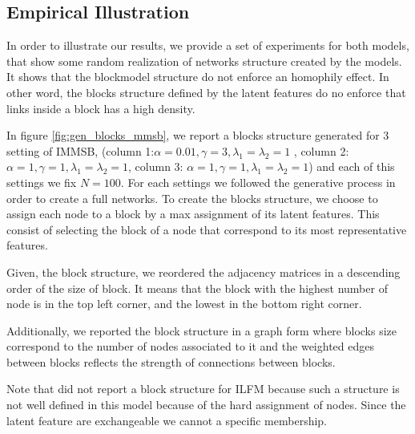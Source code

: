 \subsection{Empirical Illustration}
\label{subsec:mg}

In order to illustrate our results, we provide a set of experiments for both models, that show some random realization of networks structure created by the models. It shows that the blockmodel structure do not enforce an homophily effect. In other word, the blocks structure defined by the latent features do no enforce that links inside a block has a high density.

In figure \ref{fig:gen_blocks_mmsb}, we report a blocks structure generated for 3 setting of IMMSB, (column 1:$\alpha=0.01, \gamma=3, \lambda_1=\lambda_2=1$ , column 2:$\alpha=1, \gamma=1, \lambda_1=\lambda_2=1$, column 3: $\alpha=1, \gamma=1, \lambda_1=\lambda_2=1$) and each of this settings we fix $N=100$. For each settings we followed the generative process in order to create a full networks. To create the blocks structure, we choose to assign each node to a block by a max assignment of its latent features. This consist of selecting the block of a node that correspond to its most representative features.


Given, the block structure, we reordered the adjacency matrices in a descending order of the size of block. It means that the block with the highest number of node is in the top left corner, and the lowest in the bottom right corner.

Additionally, we reported the block structure in a graph form where blocks size correspond to the number of nodes associated to it and the weighted edges between blocks reflects the strength of connections between blocks.

Note that did not report a block structure for ILFM because such a structure is not well defined in this model because of the hard assignment of nodes. Since the latent feature are exchangeable we cannot a specific membership.

